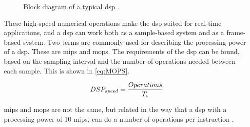 \begin{figure}
\centering
\def\svgwidth{\columnwidth}

\caption{Block diagram of a typical \gls{dsp} \cite{AnalogDialogue}.}
		\label{fig:typ_dsp}
\end{figure}

These high-speed numerical operations make the \gls{dsp} suited for real-time applications, and a \gls{dsp} can work both as a sample-based system and as a frame-based system. 
Two terms are commonly used for describing the processing power of a \gls{dsp}. These are \gls{mips} and \gls{mops}. The requirements of the \gls{dsp} can be found, based on the sampling interval and the number of operations needed between each sample. This is shown in \eqref{eq:MOPS}.

\begin{equation}\label{eq:MOPS}
        DSP_{speed} = \frac{Operations}{T_s}\addunit{MOPS}
    \end{equation}

    \startexplain
    \stopexplain
    
\gls{mips} and \gls{mops} are not the same, but related in the way that a \gls{dsp} with a processing power of 10 \gls{mips}, can do a number of operations per instruction \cite{AnalogDialogue}.

